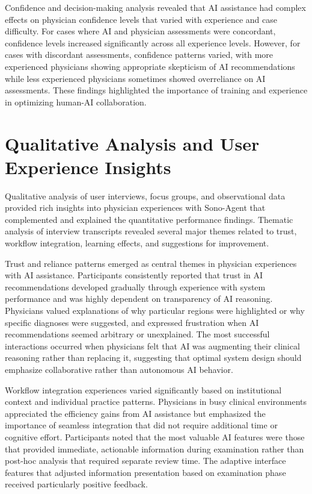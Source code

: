 Confidence and decision-making analysis revealed that AI assistance had complex effects on physician confidence levels that varied with experience and case difficulty. For cases where AI and physician assessments were concordant, confidence levels increased significantly across all experience levels. However, for cases with discordant assessments, confidence patterns varied, with more experienced physicians showing appropriate skepticism of AI recommendations while less experienced physicians sometimes showed overreliance on AI assessments. These findings highlighted the importance of training and experience in optimizing human-AI collaboration.

\section{Qualitative Analysis and User Experience Insights}

Qualitative analysis of user interviews, focus groups, and observational data provided rich insights into physician experiences with Sono-Agent that complemented and explained the quantitative performance findings. Thematic analysis of interview transcripts revealed several major themes related to trust, workflow integration, learning effects, and suggestions for improvement.

Trust and reliance patterns emerged as central themes in physician experiences with AI assistance. Participants consistently reported that trust in AI recommendations developed gradually through experience with system performance and was highly dependent on transparency of AI reasoning. Physicians valued explanations of why particular regions were highlighted or why specific diagnoses were suggested, and expressed frustration when AI recommendations seemed arbitrary or unexplained. The most successful interactions occurred when physicians felt that AI was augmenting their clinical reasoning rather than replacing it, suggesting that optimal system design should emphasize collaborative rather than autonomous AI behavior.

Workflow integration experiences varied significantly based on institutional context and individual practice patterns. Physicians in busy clinical environments appreciated the efficiency gains from AI assistance but emphasized the importance of seamless integration that did not require additional time or cognitive effort. Participants noted that the most valuable AI features were those that provided immediate, actionable information during examination rather than post-hoc analysis that required separate review time. The adaptive interface features that adjusted information presentation based on examination phase received particularly positive feedback.

